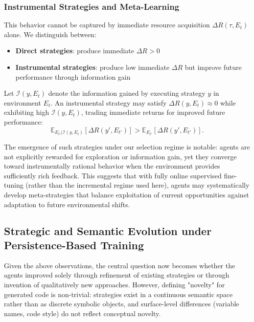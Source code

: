 \documentclass{article}
\begin{document}
\subsubsection{Instrumental Strategies and Meta-Learning}

This behavior cannot be captured by immediate resource acquisition $\Delta R(\tau, E_t)$ alone. We distinguish between:

\begin{itemize}
\item \textbf{Direct strategies}: produce immediate $\Delta R > 0$
\item \textbf{Instrumental strategies}: produce low immediate $\Delta R$ but improve future performance through information gain
\end{itemize}

Let $\mathcal{I}(y, E_t)$ denote the information gained by executing strategy $y$ in environment $E_t$. An instrumental strategy may satisfy $\Delta R(y, E_t) \approx 0$ while exhibiting high $\mathcal{I}(y, E_t)$, trading immediate returns for improved future performance:
\[
\mathbb{E}_{E_{t'} | \mathcal{I}(y, E_t)}[\Delta R(y', E_{t'})] > \mathbb{E}_{E_{t'}}[\Delta R(y', E_{t'})].
\]

The emergence of such strategies under our selection regime is notable: agents are not explicitly rewarded for exploration or information gain, yet they converge toward instrumentally rational behavior when the environment provides sufficiently rich feedback. This suggests that with fully online supervised fine-tuning (rather than the incremental regime used here), agents may systematically develop meta-strategies that balance exploitation of current opportunities against adaptation to future environmental shifts.

\subsection{Strategic and Semantic Evolution under Persistence-Based Training}

Given the above observations, the central question now becomes whether the agents improved solely through refinement of existing strategies or through invention of qualitatively new approaches. However, defining "novelty" for generated code is non-trivial: strategies exist in a continuous semantic space rather than as discrete symbolic objects, and surface-level differences (variable names, code style) do not reflect conceptual novelty.
\end{document}
